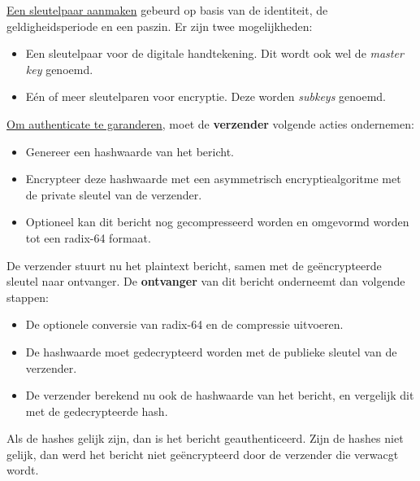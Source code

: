 \documentclass{report}
\begin{document}
	\underline{Een sleutelpaar aanmaken} gebeurd op basis van de identiteit, de geldigheidsperiode en een paszin. Er zijn twee mogelijkheden:
	\begin{itemize}
		\item[\info] Een sleutelpaar voor de digitale handtekening. Dit wordt ook wel de \emph{master key} genoemd. 
		\item[\info] Eén of meer sleutelparen voor encryptie. Deze worden \emph{subkeys} genoemd. 
	\end{itemize}

	\underline{Om authenticate te garanderen}, moet de \textbf{verzender} volgende acties ondernemen:
	\begin{itemize}
		\item[\info] Genereer een hashwaarde van het bericht.
		\item[\info] Encrypteer deze hashwaarde met een asymmetrisch encryptiealgoritme met de private sleutel van de verzender.
		\item[\info] Optioneel kan dit bericht nog gecompresseerd worden en omgevormd worden tot een radix-64 formaat.
	\end{itemize}
	De verzender stuurt nu het plaintext bericht, samen met de geëncrypteerde sleutel naar ontvanger. De \textbf{ontvanger} van dit bericht onderneemt dan volgende stappen:
	\begin{itemize}
		\item[\info] De optionele conversie van radix-64 en de compressie uitvoeren.
		\item[\info] De hashwaarde moet gedecrypteerd worden met de publieke sleutel van de verzender.
		\item[\info] De verzender berekend nu ook de hashwaarde van het bericht, en vergelijk dit met de gedecrypteerde hash. 
	\end{itemize}
	Als de hashes gelijk zijn, dan is het bericht geauthenticeerd. Zijn de hashes niet gelijk, dan werd het bericht niet geëncrypteerd door de verzender die verwacgt wordt.
\end{document}
